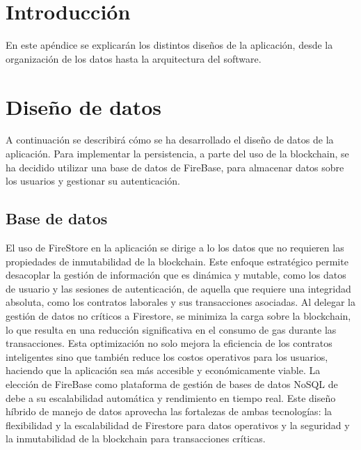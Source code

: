 
\section{Introducción}

En este apéndice se explicarán los distintos diseños de la aplicación, desde la organización de los datos hasta la arquitectura del software.

\section{Diseño de datos}

A continuación se describirá cómo se ha desarrollado el diseño de datos de la aplicación.
Para implementar la persistencia, a parte del uso de la blockchain, se ha decidido utilizar una base de datos de FireBase, para almacenar datos sobre los usuarios y gestionar su autenticación.

\subsection{Base de datos}

El uso de FireStore en la aplicación se dirige a lo los datos que no requieren las propiedades de inmutabilidad de la blockchain. Este enfoque estratégico permite desacoplar la gestión de información que es dinámica y mutable, como los datos de usuario y las sesiones de autenticación, de aquella que requiere una integridad absoluta, como los contratos laborales y sus transacciones asociadas.
Al delegar la gestión de datos no críticos a Firestore, se minimiza la carga sobre la blockchain, lo que resulta en una reducción significativa en el consumo de gas durante las transacciones. Esta optimización no solo mejora la eficiencia de los contratos inteligentes sino que también reduce los costos operativos para los usuarios, haciendo que la aplicación sea más accesible y económicamente viable.
La elección de FireBase como plataforma de gestión de bases de datos NoSQL de debe a su escalabilidad automática y rendimiento en tiempo real.
Este diseño híbrido de manejo de datos aprovecha las fortalezas de ambas tecnologías: la flexibilidad y la escalabilidad de Firestore para datos operativos y la seguridad y la inmutabilidad de la blockchain para transacciones críticas.

